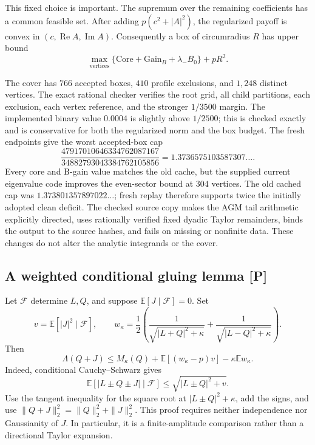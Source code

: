 This fixed choice is important. The supremum over the remaining
coefficients has a common feasible set. After adding
\(p(c^2+|A|^2)\), the regularized payoff is convex in
\((c,\operatorname{Re}A,\operatorname{Im}A)\).
Consequently a box of circumradius \(R\) has upper bound
\[
\max_{\text{vertices}}
\{\mathrm{Core}+\mathrm{Gain}_B+\lambda_- B_0\}+pR^2.
\]

The cover has \(766\) accepted boxes, \(410\) profile exclusions,
and \(1{,}248\) distinct vertices. The exact rational checker verifies
the root grid, all child partitions, each exclusion, each vertex
reference, and the stronger \(1/3500\) margin.
The implemented binary value \(0.0004\) is slightly above \(1/2500\);
this is checked exactly and is conservative for both the regularized
norm and the box budget.
The fresh endpoints give the worst accepted-box cap
\[
\frac{47917010646334762087167}{34882793043384762105856}
=1.3736575103587307\ldots.
\]
Every core and B-gain value matches the old cache, but the supplied
current eigenvalue code improves the even-sector bound at $304$ vertices.
The old cached cap was $1.373801357897022\ldots$; fresh replay therefore
supports twice the initially adopted clean deficit.
The checked source copy makes the AGM tail arithmetic explicitly
directed, uses rationally verified fixed dyadic Taylor remainders,
binds the output to the source hashes, and fails on missing or
nonfinite data.
These changes do not alter the analytic integrands or the cover.

\subsection{A weighted conditional gluing lemma [P]}
Let \(\mathcal F\) determine \(L,Q\), and suppose
\(\mathbb E[J\mid\mathcal F]=0\). Set
\[
v=\mathbb E[|J|^2\mid\mathcal F],\qquad
w_\kappa=\frac12\left(
\frac1{\sqrt{|L+Q|^2+\kappa}}+
\frac1{\sqrt{|L-Q|^2+\kappa}}\right).
\]
Then
\begin{equation}
\boxed{\Lambda(Q+J)\le M_\kappa(Q)
+\mathbb E[(w_\kappa-p)v]-\kappa\mathbb Ew_\kappa.}
\label{eq:slab-weighted-gluing}
\end{equation}
Indeed, conditional Cauchy--Schwarz gives
\[
\mathbb E[|L\pm Q\pm J|\mid\mathcal F]
\le\sqrt{|L\pm Q|^2+v}.
\]
Use the tangent inequality for the square root at
\(|L\pm Q|^2+\kappa\), add the signs, and use
\(\|Q+J\|_2^2=\|Q\|_2^2+\|J\|_2^2\).
This proof requires neither independence nor Gaussianity of \(J\).
In particular, it is a finite-amplitude comparison rather than a
directional Taylor expansion.

